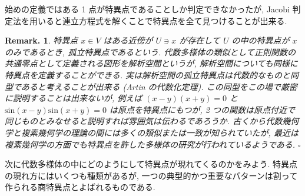 \documentclass[openany, a4paper, oneside]{jsbook}
\theoremstyle{break}
\theoremstyle{breakdefn}
\newtheorem{rem}[thm]{Remark.}
\newcommand{\fin}{\hfill $\square$ \par}
\begin{document}
始めの定義ではある 1 点が特異点であることしか判定できなかったが,
Jacobi 判定法を用いると連立方程式を解くことで特異点を全て見つけることが出来る.
\begin{rem}
特異点 $x \in V$ はある近傍が $U \ni x$ が存在して $U$ の中の特異点が $x$ のみであるとき, 孤立特異点であるという.
代数多様体の類似として正則関数の共通零点として定義される図形を解析空間というが,
解析空間についても同様に特異点を定義することができる.
実は解析空間の孤立特異点は代数的なものと同型であると考えることが出来る (Artin の代数化定理).
この同型をこの場で厳密に説明することは出来ないが,
例えば $(x-y) (x+y)=0$ と $\mathrm{sin}(x-y)\mathrm{sin}(x+y)=0$ は原点を特異点にもつが,
2 つの関数は原点付近で同じものとみなせると説明すれば雰囲気は伝わるであろうか.
古くから代数幾何学と複素幾何学の理論の間には多くの類似または一致が知られていたが,
最近は複素幾何学の方面でも特異点を許した多様体の研究が行われているようである. \fin
\end{rem}

次に代数多様体の中にどのようにして特異点が現れてくるのかをみよう.
特異点の現れ方にはいくつも種類があるが, 一つの典型的かつ重要なパターンは割って作られる商特異点とよばれるものである.
\end{document}
